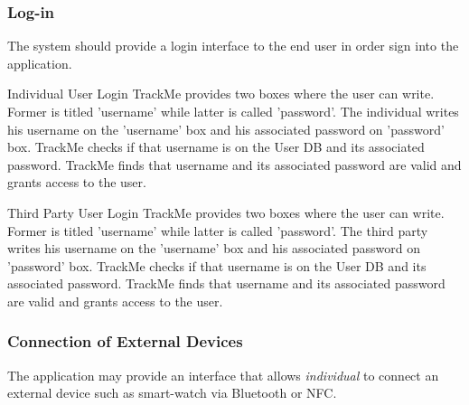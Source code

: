 \documentclass[a4paper]{article}
\begin{document}
        \subsubsection{Log-in}
        The system should provide a login interface to the end user in order sign into the application.
        
        \begin{usecase}{Individual User Login}
              {TrackMe provides two boxes where the user can write. Former is titled 'username' while latter is called 'password'.}
              {The individual writes his username on the 'username' box and his associated password on 'password' box.}
              {TrackMe checks if that username is on the User DB and its associated password.}
              {TrackMe finds that username and its associated password are valid and grants access to the user.}
        \end{usecase}
        
        \begin{usecase}{Third Party User Login}
              {TrackMe provides two boxes where the user can write. Former is titled 'username' while latter is called 'password'.}
              {The third party writes his username on the 'username' box and his associated password on 'password' box.}
              {TrackMe checks if that username is on the User DB and its associated password.}
              {TrackMe finds that username and its associated password are valid and grants access to the user.}
        \end{usecase}
        
        \subsubsection{Connection of External Devices}
        The application may provide an interface that allows \textit{individual} to connect an external device such as smart-watch via Bluetooth or NFC.
        
\end{document}
